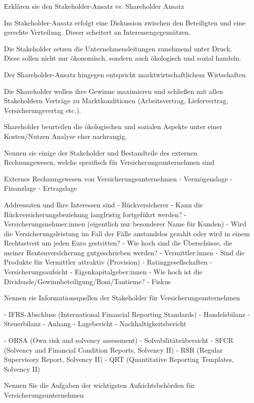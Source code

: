 Erklären sie den Stakeholder-Ansatz vs. Shareholder Ansatz

Im Stakeholder-Ansatz erfolgt eine Diskussion zwischen den
Beteiligten und eine gerechte Verteilung. Dieser scheitert an
Interessengegensätzen.

Die Stakeholder setzen die Unternehmensleitungen
zunehmend unter Druck. Diese sollen nicht nur ökonomisch,
sondern auch ökologisch und sozial handeln. 

Der Shareholder-Ansatz hingegen entspricht
marktwirtschaftlichem Wirtschaften

Die Shareholder wollen ihre Gewinne maximieren und
schließen mit allen Stakeholdern Verträge zu
Marktkonditionen (Arbeitsvertrag, Liefervertrag,
Versicherungsvertag etc.).

Shareholder beurteilen die ökologischen und sozialen
Aspekte unter einer Kosten/Nutzen Analyse eher nachrangig. 


Nennen sie einige der Stakeholder und Bestandteile des externen Rechnungswesen, welche spezifisch für Versicherungsunternehmen sind

Externes Rechnungswesen von Versicherungsunternehmen
- Vermögenslage 
- Finanzlage 
- Ertragslage

Addressaten und Ihre Interessen sind
- Rückversicherer
  - Kann die Rückversicherungsbeziehung langfristig fortgeführt werden?
- Versicherungsnehmer:innen (eigentlich nur besonderer Name für Kunden)
  - Wird die Versicherungsleistung im Fall der
    Fälle anstandslos gezahlt oder wird in einem
    Rechtsstreit um jeden Euro gestritten?
  - Wie hoch sind die Überschüsse, die meiner
    Rentenversicherung gutgeschrieben werden?
- Vermittler:innen 
  - Sind die Produkte für Vermittler attraktiv (Provision)
- Ratinggesellschaften
- Versicherungsaufsicht
- Eigenkapitalgeber:innen
  - Wie hoch ist die Dividende/Gewinnbeteiligung/Boni/Tantieme?
- Fiskus

Nennen sie Informationsquellen der Stakeholder für Versicherungsunternehmen 

- IFRS-Abschluss (International Financial Reporting Standards)
- Handelsbilanz
- Steuerbilanz
- Anhang
- Lagebericht
- Nachhaltigkeitsbericht

- ORSA (Own risk and solvency assessment)
- Solvabilitätsübersicht
- SFCR (Solvency and Financial Condition Reports, Solvency II)
- RSR (Regular Supervisory Report, Solvency II) 
- QRT (Quantitative Reporting Templates, Solvency II)


Nennen Sie die Aufgaben der wichtigsten Aufsichtsbehörden für Versicherungsunternehmen

